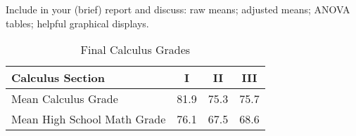 \documentclass[10pt]{article}
\begin{document}
Include in your (brief) report and discuss: raw means; adjusted means; ANOVA tables; helpful graphical displays.


\begin{table}[ht]
  \begin{center}
    \begin{tabular}{|l|ccc|}
      \hline
      Calculus Section &I &II &III\\
      \hline
      Mean Calculus Grade &81.9 &75.3 &75.7\\
      Mean High School Math Grade &76.1 &67.5 &68.6\\
      \hline
    \end{tabular}
    \caption{Final Calculus Grades}
    \label{calctable}
  \end{center}
\end{table}
\end{document}
